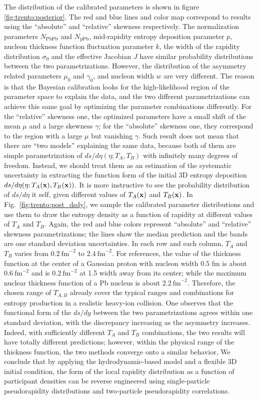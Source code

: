 The distribution of the calibrated parameters is shown in figure \ref{fig:trento:posterior}.
The red and blue lines and color map correspond to results using the ``absolute'' and ``relative'' skewness respectively.
The normalization parameters $N_{\textrm{PbPb}}$ and $N_{\textrm{pPb}}$, mid-rapidity entropy deposition parameter $p$, nucleon thickness function fluctuation parameter $k$, the width of the rapidity distribution $\sigma_0$ and the effective Jacobian $J$ have similar probability distributions between the two parametrizations.
However, the distribution of the asymmetry related parameters $\mu_0$ and $\gamma_0$, and nucleon width $w$ are very different.
The reason is that the Bayesian calibration looks for the high-likelihood region of the parameter space to explain the data, and the two different parametrizations can achieve this same goal by optimizing the parameter combinations differently.
For the ``relative'' skewness one, the optimized parameters have a small shift of the mean $\mu$ and a large skewness $\gamma$; for the ``absolute'' skewness one, they correspond to the region with a large $\mu$ but vanishing $\gamma$.
Such result does not mean that there are ``two models'' explaining the same data, because both of them are simple parametrization of $ds/d\eta(\eta; T_A, T_B)$ with infinitely many degrees of freedom. 
Instead, we should treat them as an estimation of the systematic uncertainty in extracting the function form of the initial 3D entropy deposition $ds/d\eta(\eta; T_A(\mathbf x), T_B(\mathbf x))$.
It is more instructive to see the probability distribution of $ds/d\eta$ it self, given different values of $T_A(\mathbf x)$ and $T_B(\mathbf x)$.
In Fig.~\ref{fig:trento:post_dsdy}, we sample the calibrated parameter distributions and use them to draw the entropy density as a function of rapidity at different values of $T_A$ and $T_B$. 
Again, the red and blue colors represent ``absolute'' and ``relative'' skewness parametrizations; the lines show the median prediction and the bands are one standard deviation uncertainties. 
In each row and each column, $T_A$ and $T_B$ varies from $0.2~\text{fm}^{-2}$ to $2.4~\text{fm}^{-2}$. 
For references, the value of the thickness function at the center of a Gaussian proton with nucleon width $0.5$ fm is about $0.6~\text{fm}^{-2}$ and is $0.2~\text{fm}^{-2}$  at 1.5 width away from its center; while the maximum nuclear thickness function of a Pb nucleus is about $2.2~\text{fm}^{-2}$.
Therefore, the chosen range of $T_{A,B}$ already cover the typical ranges and combinations for entropy production in a realistic heavy-ion collision.
One observes that the functional form of the $ds/dy$ between the two parametrizations agrees within one standard deviation, with the discrepancy increasing as the asymmetry increases.
Indeed, with sufficiently different $T_A$ and $T_B$ combinations, the two results will have totally different predictions; however, within the physical range of the thickness function, the two methods converge onto a similar behavior,
We conclude that by applying the hydrodynamic-based model and a flexible 3D initial condition, the form of the local rapidity distribution as a function of participant densities can be reverse engineered using single-particle pseudorapidity distributions and two-particle pseudorapidity correlations.

